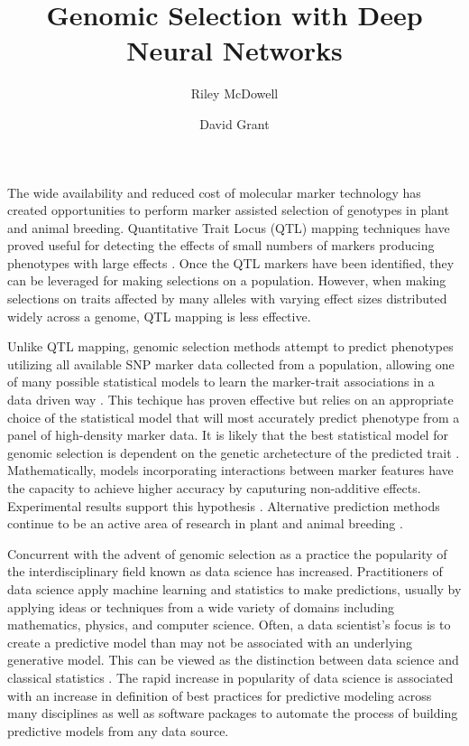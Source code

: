 \documentclass[9pt,twocolumn,twoside]{g3_article/gsag3jnl}
\title{Genomic Selection with Deep Neural Networks}
\author[$\ast$,1]{Riley McDowell}
\author[$\dagger$]{David Grant}
\affil[$\ast$]{Iowa State University, US}
\affil[$\dagger$]{Iowa State University, US}
\begin{document}
\maketitle
\thispagestyle{firststyle}
\logomark
\articletypemark
\marginmark
\firstpagefootnote
{}
\vspace{-11pt}

\noindent %

The wide availability and reduced cost of molecular marker technology
has created opportunities to perform marker assisted selection of genotypes
in plant and animal breeding. Quantitative Trait Locus (QTL) mapping techniques
have proved useful for detecting the effects of small numbers of markers producing 
phenotypes with large effects \citep{miles2008}. Once the QTL 
markers have been identified, they can be leveraged for making selections
on a population. However, when making selections on traits affected by many 
alleles with varying effect sizes distributed widely across a genome, 
QTL mapping is less effective. 

Unlike QTL mapping, genomic selection methods attempt to predict phenotypes 
utilizing all available SNP marker data collected from a population,
allowing one of many possible statistical models to learn the marker-trait 
associations in a data driven way \citep{meuwissen2001}. This techique has
proven effective but relies on an appropriate choice of the statistical 
model that will most accurately predict phenotype from a panel of high-density 
marker data. It is likely that the best statistical model for 
genomic selection is dependent on the genetic archetecture of the 
predicted trait \citep{crossa2010, gonzalez-camacho2012, 
resende2012, cleveland2012, thavamanikumar2015}.  Mathematically, models incorporating 
interactions between marker features have the capacity to achieve higher accuracy 
by caputuring non-additive effects. Experimental results support this 
hypothesis \citep{gonzalez-camacho2012}. Alternative prediction methods continue 
to be an active area of research in plant and animal breeding \citep{koning2012}.

Concurrent with the advent of genomic selection as a practice the popularity of the 
interdisciplinary field known as data science has increased. Practitioners of data 
science apply machine learning and statistics to make predictions, usually
by applying ideas or techniques from a wide variety of domains 
including mathematics, physics, and computer science. Often, a data scientist's focus is to
create a predictive model than may not be associated with an underlying generative model. 
This can be viewed as the distinction between data science and classical statistics 
\citep{donoho2015, breiman2001}. The rapid increase in popularity of data science
is associated with an increase in definition of best practices for predictive modeling
across many disciplines as well as software packages to automate the 
process of building predictive models from any data source.
\end{document}
